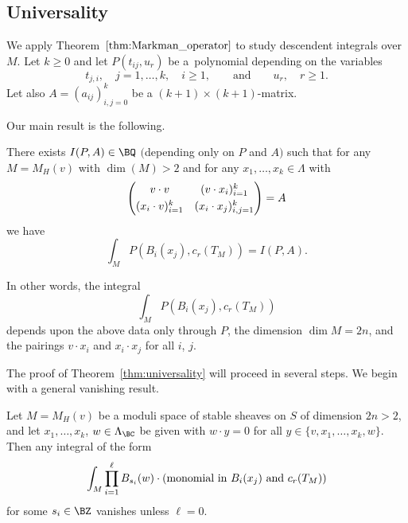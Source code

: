 \subsection{Universality}
We apply Theorem~$\ref{thm:Markman_operator}$ to study descendent integrals over $M$.
Let $k \geq 0$ and let $P(t_{ij}, u_r)$ be a~polynomial depending on the variables
\[
t_{j,i}, \quad j = 1, \dots, k, \quad i \geq 1, \qquad \text{and} \qquad u_r, \quad r \geq 1.
\]
Let also $A = (a_{ij})_{i,j=0}^{k}$ be a $(k+1) \times (k+1)$-matrix.

Our main result is the following.

\begin{thm}[universality] \label{thm:universality}
There exists $I(P,A) \in \BQ$ $($depending only on $P$ and $A)$ such that
for any $M = M_H(v)$ with $\dim(M)>2$ and for any $x_1, \dots, x_k \in \Lambda$ with
\begin{equation} \label{intersection matrix} \begin{pmatrix}
v \cdot v & (v \cdot x_i)_{i=1}^k \vspace{1mm}\\
(x_i \cdot v)_{i=1}^{k} & ( x_{i} \cdot x_j )_{i,j=1}^{k}
\end{pmatrix} = A \end{equation}
we have
\[ \int_{M} P( B_i(x_j), c_r(T_M) ) = I(P,A). \]
\end{thm}

In other words, the integral
\[ \int_{M} P( B_i(x_j) , c_r(T_M) ) \]
depends upon the above data only through $P$,
the dimension $\dim M = 2n$,
and the pairings $v \cdot x_i$ and $x_i \cdot x_j$ for all $i$, $j$.

The proof of Theorem~\ref{thm:universality} will proceed in several steps.
We begin with a general vanishing result.
\begin{prop} \label{prop:vanishing}
Let $M=M_H(v)$ be a moduli space of stable sheaves on $S$ of dimension $2n>2$,
and let $x_1, \dots, x_k$, $w \in \Lambda_{\BC}$ be given with $w \cdot y = 0$ for all $y \in \{ v, x_1, \dots, x_k, w \}$.
Then any integral of the form
\begin{equation} \label{monomial}
\int_{M} \prod_{i=1}^{\ell} B_{s_i}(w) \cdot (\textup{monomial in } B_i(x_j) \textup{ and } c_r(T_M))
\end{equation}
for some $s_i \in \BZ$ vanishes unless $\ell=0$.
\end{prop}

